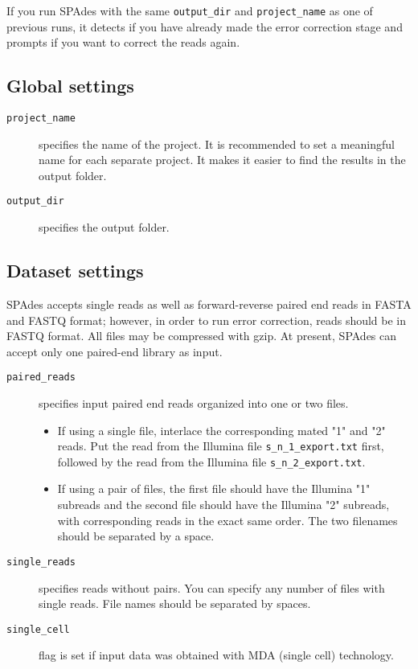 \documentclass{article}
\def\spades{SPAdes}
\begin{document}
If you run {\spades} with the same {\tt output\_dir} and {\tt project\_name} as one of previous runs, it detects if you have already made the error correction stage and prompts if you want to correct the reads again.

\subsection{Global settings}
\begin{description}
\item[{\tt project\_name}] specifies the name of the project. It is recommended to set a meaningful name for each separate project.
It makes it easier to find the results in the output folder.
\item[{\tt output\_dir}] specifies the output folder.
\end{description}

\subsection{Dataset settings}
{\spades} accepts single reads as well as forward-reverse paired end reads
in FASTA and FASTQ format; however, in order to run error correction, reads should be in FASTQ format. All files may be compressed with gzip.
At present, {\spades} can accept only one paired-end library as input.

\begin{description}
\item[{\tt paired\_reads}] specifies input paired end reads organized into one or two files.
\begin{itemize}
\item If using a single file, interlace the corresponding mated "1" and "2" reads. Put the read from the Illumina file {\tt s\_n\_1\_export.txt} first, followed by the read from the Illumina file {\tt s\_n\_2\_export.txt}.
\item If using a pair of files, the first file should have the Illumina "1" subreads and the second file should have the Illumina "2" subreads, with corresponding reads in the exact same order.  The two filenames should be separated by a space.
\end{itemize}
\item[{\tt single\_reads}] specifies reads without pairs. You can specify any number of
files with single reads. File names should be separated by spaces.
\item[{\tt single\_cell}] flag is set if input data was obtained with MDA (single cell) technology.
\end{description}
\end{document}
